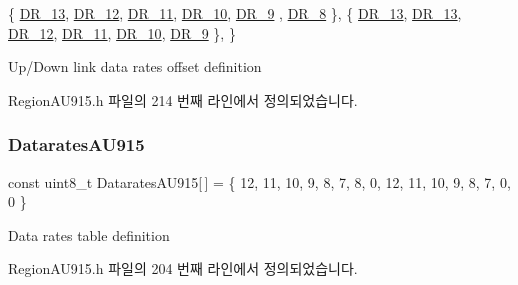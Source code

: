 \begin{DoxyCode}
    \{ \mbox{\hyperlink{group___r_e_g_i_o_n_ga226f47470cc69a6fe831f7c92709bc1f}{DR\_13}}, \mbox{\hyperlink{group___r_e_g_i_o_n_gafcf0cda11eda5db3d4c4e9a5bd79c0d5}{DR\_12}}, \mbox{\hyperlink{group___r_e_g_i_o_n_ga77672781eaa7dc6f6892195739a5ef27}{DR\_11}}, \mbox{\hyperlink{group___r_e_g_i_o_n_ga8cc471faabc38682537f6a60a30844e4}{DR\_10}}, \mbox{\hyperlink{group___r_e_g_i_o_n_ga67346d631ba28781d6dffb2a7b6fd22f}{DR\_9}} , \mbox{\hyperlink{group___r_e_g_i_o_n_ga44cc96ba80ae464cd9330b784d329c16}{DR\_8}}  \}, 
    \{ \mbox{\hyperlink{group___r_e_g_i_o_n_ga226f47470cc69a6fe831f7c92709bc1f}{DR\_13}}, \mbox{\hyperlink{group___r_e_g_i_o_n_ga226f47470cc69a6fe831f7c92709bc1f}{DR\_13}}, \mbox{\hyperlink{group___r_e_g_i_o_n_gafcf0cda11eda5db3d4c4e9a5bd79c0d5}{DR\_12}}, \mbox{\hyperlink{group___r_e_g_i_o_n_ga77672781eaa7dc6f6892195739a5ef27}{DR\_11}}, \mbox{\hyperlink{group___r_e_g_i_o_n_ga8cc471faabc38682537f6a60a30844e4}{DR\_10}}, \mbox{\hyperlink{group___r_e_g_i_o_n_ga67346d631ba28781d6dffb2a7b6fd22f}{DR\_9}}  \}, 
\}
\end{DoxyCode}
Up/\+Down link data rates offset definition 

Region\+A\+U915.\+h 파일의 214 번째 라인에서 정의되었습니다.

\mbox{\label{group___r_e_g_i_o_n_a_u915_gaf86f3852261cee915f4132bd35e6c188}} 
\subsubsection{\texorpdfstring{Datarates\+A\+U915}{DataratesAU915}}
{\footnotesize\ttfamily const uint8\+\_\+t Datarates\+A\+U915\mbox{[}$\,$\mbox{]} = \{ 12, 11, 10, 9, 8, 7, 8, 0, 12, 11, 10, 9, 8, 7, 0, 0 \}\hspace{0.3cm}{\ttfamily [static]}}

Data rates table definition 

Region\+A\+U915.\+h 파일의 204 번째 라인에서 정의되었습니다.

\mbox{\label{group___r_e_g_i_o_n_a_u915_gabe0bab50ef304824a4ed2710876e948b}} 
